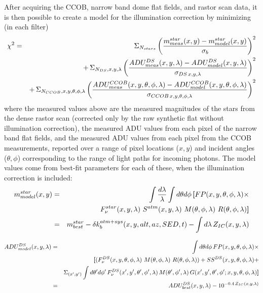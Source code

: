 \documentclass[12pt,preprint]{aastex}
\begin{document}
After acquiring the CCOB, narrow band dome flat fields, and rastor
scan data, it is then possible to create a model for the illumination
correction by minimizing (in each filter)
\begin{eqnarray}
 \chi^2 & = & \Sigma_{N_{stars}} \left( { m^{star}_{meas}(x,y) - m^{star}_{model}(x,y)
\over \sigma_b} \right)^2  \\
  & & +\, \Sigma_{N_{DS}, x,y,\lambda} \left( {
    ADU^{DS}_{meas}(x,y,\lambda) - ADU^{DS}_{ model}(x,y,\lambda) \over
    \sigma_{DS \, x,y,\lambda } } \right)^2  \nonumber  \\
 & & +\,  \Sigma_{N_{CCOB},x,y,\theta,\phi,\lambda} \left( { 
   ADU^{CCOB}_{meas}(x,y,\theta,\phi,\lambda) - ADU^{CCOB}_{model}(x,y,\theta,\phi,\lambda) \over
   \sigma_{CCOB \,x,y,\theta,\phi,\lambda}}  \right)^2   \nonumber
\end{eqnarray}
where the measured values above are the measured magnitudes of the stars
from the dense rastor scan (corrected only by the raw synthetic flat
without illumination correction), the measured ADU values from each pixel of the narrow band
flat fields, and the measured ADU values from each pixel from the CCOB
measurements, reported over a range of pixel locations ($x,y$) and incident
angles ($\theta,\phi$) corresponding to the range of light paths for
incoming photons. The model values come from best-fit parameters for each
of these, when the illumination correction is included: 
\begin{eqnarray}
m^{star}_{model}(x,y) & = &  \int {d\lambda \over \lambda} \int d\theta d\phi \, {\textbf[} FP(x,y,\theta,\phi,\lambda) \times \nonumber \\
&& F_\nu^{star}(x,y,\lambda)\,\, S^{atm}(x,y,\lambda)\, \,M(\theta,\phi,\lambda)\,\,R(\theta,\phi,\lambda) {\textbf]} \nonumber \\
 & = & m^{star}_{best} - \delta k_{b}^{atm+sys}(x,y,alt,az,SED,t) - \int d\lambda \, Z_{IC}(x,y,\lambda)
\end{eqnarray}


\begin{eqnarray}
ADU^{DS}_{model}(x,y,\lambda) & = & \int d\theta d\phi \, FP(x,y,\theta,\phi,\lambda) \times  \nonumber \\
& & {\textbf[}  (F_\nu^{DS}(x,y,\theta,\phi,\lambda)\,\, M(\theta,\phi,\lambda)\,\, R(\theta,\phi,\lambda)) 
+ SS^{DS}(x,y,\theta,\phi,\lambda) +  \nonumber \\ 
& & \Sigma_{(x',y')} \int d\theta' d\phi' \,F_\nu^{DS}(x',y',\theta', \phi',\lambda)\,M(\theta',\phi',\lambda)\,G(x',y',\theta',\phi'; x,y,\theta,\phi,\lambda) {\textbf]} \nonumber  \\
 & = & ADU^{DS}_{best}(x,y,\lambda) - 10^{-0.4 \, Z_{IC}(x,y,\lambda)} 
\end{eqnarray}
\end{document}
